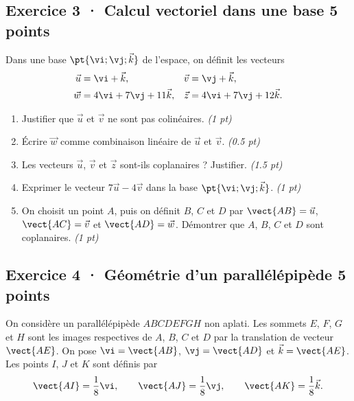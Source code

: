 \mxnewpage{}

\subsection*{Exercice 3 · Calcul vectoriel dans une base \hfill 5 points}Dans une base $\pt{\vi;\vj;\vec k}$ de l'espace, on définit les vecteurs
\[\begin{aligned}\vec u&=\vi+\vec k,&\vec v&=\vj+\vec k,\\
\vec w&=4\vi+7\vj+11\vec k,&\vec z&=4\vi+7\vj+12\vec k.\end{aligned}\]

\begin{enumerate}

\item Justifier que $\vec u$ et $\vec v$ ne sont pas colinéaires. \hfill\textit{(1 pt)}

\item Écrire $\vec w$ comme combinaison linéaire de $\vec u$ et $\vec v$. \hfill\textit{(\num{0,5} pt)}

\item Les vecteurs $\vec u$, $\vec v$ et $\vec z$ sont-ils coplanaires ? Justifier. \hfill\textit{(\num{1,5} pt)}

\item Exprimer le vecteur $7\vec u-4\vec v$ dans la base $\pt{\vi;\vj;\vec k}$. \hfill\textit{(1 pt)}

\item On choisit un point $A$, puis on définit $B$, $C$ et $D$ par $\vect{AB}=\vec u$, $\vect{AC}=\vec v$ et $\vect{AD}=\vec w$. Démontrer que $A$, $B$, $C$ et $D$ sont coplanaires. \hfill\textit{(1 pt)}

\end{enumerate}

\subsection*{Exercice 4 · Géométrie d'un parallélépipède \hfill 5 points}On considère un parallélépipède $ABCDEFGH$ non aplati. Les sommets $E$, $F$, $G$ et $H$ sont les images respectives de $A$, $B$, $C$ et $D$ par la translation de vecteur $\vect{AE}$.
On pose $\vi=\vect{AB}$, $\vj=\vect{AD}$ et $\vec k=\vect{AE}$.
Les points $I$, $J$ et $K$ sont définis par
\[\vect{AI}=\frac1{8}\vi,\qquad\vect{AJ}=\frac1{8}\vj,\qquad\vect{AK}=\frac1{8}\vec k.\]

